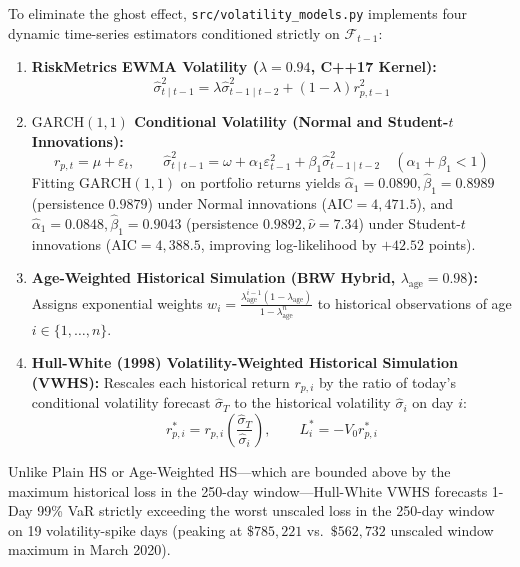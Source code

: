 \documentclass[11pt,a4paper]{article}
\begin{document}
To eliminate the ghost effect, \texttt{src/volatility\_models.py} implements four dynamic time-series estimators conditioned strictly on $\mathcal{F}_{t-1}$:
\begin{enumerate}
    \item \textbf{RiskMetrics EWMA Volatility ($\lambda = 0.94$, C++17 Kernel):}
    \begin{equation}
    \hat{\sigma}_{t \mid t-1}^2 = \lambda\hat{\sigma}_{t-1 \mid t-2}^2 + (1-\lambda)r_{p,t-1}^2
    \end{equation}
    \item \textbf{$\text{GARCH}(1,1)$ Conditional Volatility (Normal and Student-$t$ Innovations):}
    \begin{equation}
    r_{p,t} = \mu + \varepsilon_t, \qquad \hat{\sigma}_{t \mid t-1}^2 = \omega + \alpha_1\varepsilon_{t-1}^2 + \beta_1\hat{\sigma}_{t-1 \mid t-2}^2 \quad (\alpha_1 + \beta_1 < 1)
    \end{equation}
    Fitting $\text{GARCH}(1,1)$ on portfolio returns yields $\hat{\alpha}_1 = 0.0890, \hat{\beta}_1 = 0.8989$ (persistence $0.9879$) under Normal innovations ($\text{AIC} = 4,471.5$), and $\hat{\alpha}_1 = 0.0848, \hat{\beta}_1 = 0.9043$ (persistence $0.9892, \hat{\nu} = 7.34$) under Student-$t$ innovations ($\text{AIC} = 4,388.5$, improving log-likelihood by $+42.52$ points).
    \item \textbf{Age-Weighted Historical Simulation (BRW Hybrid, $\lambda_{\text{age}} = 0.98$):} Assigns exponential weights $w_i = \frac{\lambda_{\text{age}}^{i-1}(1-\lambda_{\text{age}})}{1-\lambda_{\text{age}}^n}$ to historical observations of age $i \in \{1, \dots, n\}$.
    \item \textbf{Hull-White (1998) Volatility-Weighted Historical Simulation (VWHS):} Rescales each historical return $r_{p,i}$ by the ratio of today's conditional volatility forecast $\hat{\sigma}_T$ to the historical volatility $\hat{\sigma}_i$ on day $i$:
    \begin{equation}
    r_{p,i}^* = r_{p,i}\left(\frac{\hat{\sigma}_T}{\hat{\sigma}_i}\right), \qquad L_i^* = -V_0 r_{p,i}^*
    \end{equation}
\end{enumerate}

Unlike Plain HS or Age-Weighted HS---which are bounded above by the maximum historical loss in the 250-day window---Hull-White VWHS forecasts 1-Day 99\% VaR strictly exceeding the worst unscaled loss in the 250-day window on 19 volatility-spike days (peaking at $\$785,221$ vs.\ $\$562,732$ unscaled window maximum in March 2020).
\end{document}
